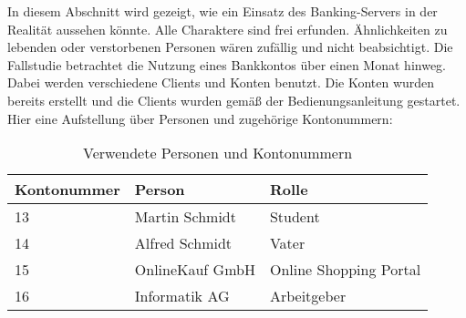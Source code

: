 In diesem Abschnitt wird gezeigt, wie ein Einsatz des Banking-Servers in der Realität aussehen könnte. Alle Charaktere sind frei erfunden. Ähnlichkeiten zu lebenden oder verstorbenen Personen wären zufällig und nicht beabsichtigt. Die Fallstudie betrachtet die Nutzung eines Bankkontos über einen Monat hinweg. Dabei werden verschiedene Clients und Konten benutzt. Die Konten wurden bereits erstellt und die Clients wurden gemäß der Bedienungsanleitung gestartet. Hier eine Aufstellung über Personen und zugehörige Kontonummern:

\begin{table}[h]
\begin{tabular}{p{3 cm}| p{3 cm}| p{3 cm}}
Kontonummer & Person & Rolle\\
				\hline
				\hline
13 & Martin Schmidt & Student\\ \hline

14 & Alfred Schmidt & Vater\\ \hline

15 & OnlineKauf GmbH & Online Shopping Portal\\ \hline

16 & Informatik AG & Arbeitgeber\\ \hline
\end{tabular}\\
\caption{Verwendete Personen und Kontonummern}
\end{table}

